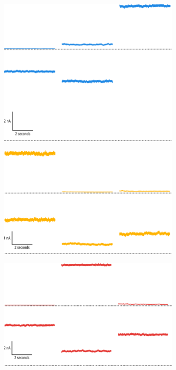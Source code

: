 \begin{figure}[hbtp]
	\centering
	\begin{subfigure}[t]{0.3\textwidth}
		\caption{}\label{ch4fig:noise_example_1}
		\centering
		\includegraphics[width=\textwidth]{noise_example_1.pdf}
	\end{subfigure}
	\hfill
	\begin{subfigure}[t]{0.3\textwidth}
		\caption{}\label{ch4fig:noise_example_2}
		\centering
		\includegraphics[width=\textwidth]{noise_example_2.pdf}
	\end{subfigure}
	\hfill
	\begin{subfigure}[t]{0.3\textwidth}
		\caption{}\label{ch4fig:noise_example_3}
		\centering
		\includegraphics[width=\textwidth]{noise_example_3.pdf}

\end{subfigure}
\end{figure}
